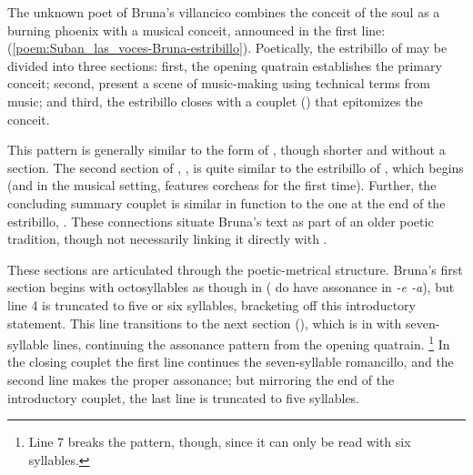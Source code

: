 The unknown poet of Bruna's villancico combines the conceit of the soul as a burning phoenix with a musical conceit, announced in the first line:  (\cref{poem:Suban_las_voces-Bruna-estribillo}).
Poetically, the estribillo of  may be divided into three sections: first, the opening quatrain establishes the primary conceit; second,  present a scene of music-making using technical terms from music; and third, the estribillo closes with a couplet () that epitomizes the conceit.

This pattern is generally similar to the form of , though shorter and without a  section.
The second section of , , is quite similar to the estribillo of , which begins  (and in the musical setting, features corcheas for the first time).
Further, the concluding summary couplet is similar in function to the one at the end of the  estribillo, .
These connections situate Bruna's text as part of an older poetic tradition, though not necessarily linking it directly with .

% 	
% 
% 	

These sections are articulated through the poetic-metrical structure.
Bruna's first section begins with octosyllables as though in  ( do have assonance in \emph{-e -a}), but line 4 is truncated to five or six syllables, bracketing off this introductory statement.
This line transitions to the next section (), which is in  with seven-syllable lines, continuing the assonance pattern from the opening quatrain.%
	\footnote{%
	Line 7 breaks the pattern, though, since it can only be read with six syllables.
	}
In the closing couplet the first line continues the seven-syllable romancillo, and the second line makes the proper assonance; but mirroring the end of the introductory couplet, the last line is truncated to five syllables.

